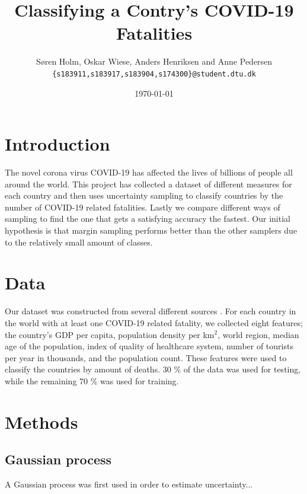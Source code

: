 \documentclass[12pt,fleqn]{article}
\title{\vspace*{-3.75cm}Classifying a Contry's COVID-19 Fatalities}
\author{Søren Holm, Oskar Wiese, Anders Henriksen and Anne Pedersen \\
	\small {\texttt{\{s183911,s183917,s183904,s174300\}@student.dtu.dk}}}
\date{\today}
\begin{document}
	
	\maketitle
	 
	
	\begin{abstract} %
		
	\end{abstract}
	
	\begin{multicols}{2}
		
		
		\section{Introduction} %
		The novel corona virus COVID-19 has affected the lives of billions of people all around the world. This project has collected a dataset of different measures for each country and then uses uncertainty sampling to classify countries by the number of COVID-19 related fatalities. Lastly we compare different ways of sampling to find the one that gets a satisfying accuracy the fastest. Our initial hypothesis is that margin sampling performs better than the other samplers due to the relatively small amount of classes. 
		
		\section{Data} 
		Our dataset was constructed from several different sources \cite{density, corona, alder, bnp, region, healthcare, turist}. For each country in the world with at least one COVID-19 related fatality, we collected eight features; the country's GDP per capita, population density per km$^2$, world region, median age of the population, index of quality of healthcare system, number of tourists per year in thousands, and the population count. These features were used to classify the countries by amount of deaths. 30 \% of the data was used for testing, while the remaining 70 \% was used for training. %

		\section{Methods}
		\subsection{Gaussian process} %
		A Gaussian process was first used in order to estimate uncertainty...
		

\end{multicols}
\end{document}
